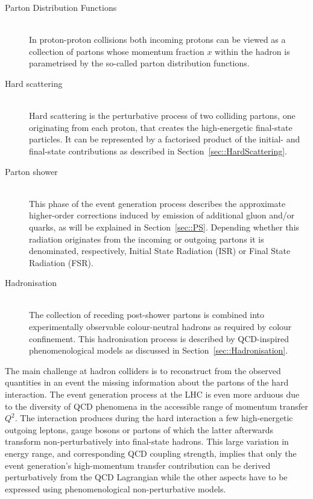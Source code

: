 \begin{myindentpar}
  \begin{description}
    \item[Parton Distribution Functions] \hfill \\
      In proton-proton collisions both incoming protons can be viewed as a collection of partons whose momentum fraction $x$ within the hadron is parametrised by the so-called parton distribution functions.
    \item[Hard scattering] \hfill \\
      Hard scattering is the perturbative process of two colliding partons, one originating from each proton, that creates the high-energetic final-state particles. It can be represented by a factorised product of the initial- and final-state contributions as described in Section~\ref{sec::HardScattering}.
    \item[Parton shower] \hfill \\
      This phase of the event generation process describes the approximate higher-order corrections induced by emission of additional gluon and/or quarks, as will be explained in Section~\ref{sec::PS}. Depending whether this radiation originates from the incoming or outgoing partons it is denominated, respectively, Initial State Radiation (ISR) or Final State Radiation (FSR).
    \item[Hadronisation] \hfill \\
      The collection of receding post-shower partons is combined into experimentally observable colour-neutral hadrons as required by colour confinement. This hadronisation process is described by QCD-inspired phenomenological models as discussed in Section~\ref{sec::Hadronisation}.
  \end{description}
\end{myindentpar}

The main challenge at hadron colliders is to reconstruct from the observed quantities in an event the missing information about the partons of the hard interaction. 
The event generation process at the LHC is even more arduous due to the diversity of QCD phenomena in the accessible range of momentum transfer $Q^{2}$. %
The interaction produces during the hard interaction a few high-energetic outgoing leptons, gauge bosons or partons of which the latter afterwards transform non-perturbatively into final-state hadrons. This large variation in energy range, and corresponding QCD coupling strength, implies that only the event generation's high-momentum transfer contribution can be derived perturbatively from the QCD Lagrangian while the other aspects have to be expressed using phenomenological non-perturbative models.

